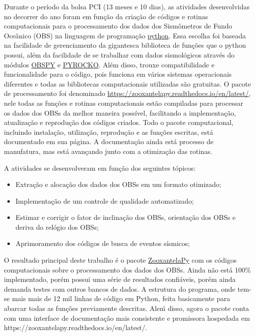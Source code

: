 \documentclass[10pt,a4paper,oneside]{book}
\begin{document}
Durante o período da bolsa PCI (13 meses e 10 dias), as atividades desenvolvidas no decorrer do ano foram em função da criação de códigos e rotinas computacionais para o processamento dos dados dos Sismômetros de Fundo Oceânico (OBS) na linguagem de programação \href{https://www.python.org/}{python}. Essa escolha foi baseada na facilidade de gerenciamento da gigantesca biblioteca de funções que o python possui, além da facilidade de se trabalhar com dados sismológicos através do módulos \href{https://docs.obspy.org/}{OBSPY} e \href{https://pyrocko.org/}{PYROCKO}. Além disso, trouxe compatibilidade e funcionalidade para o código, pois funciona em vários sistemas operacionais diferentes e todas as bibliotecas computacionais utilizadas são gratuitas. O pacote de processamento foi denominado \href{ZooxantelaPy - Ocean Bottom Seismometer Toolkit}{https://zooxantelapy.readthedocs.io/en/latest/}, nele todas as funções e rotinas computacionais estão compiladas para processar  os dados dos OBSs da melhor maneira possível, facilitando a implementação, atualização e reprodução dos códigos criados. Todo o pacote computacional, incluindo instalação, utilização, reprodução e as funções escritas, está documentado em sua página. A documentação ainda está processo de manufatura, mas está avançando junto com a otimização das rotinas.

A atividades se desenvolveram em função dos seguintes tópicos:
\begin{itemize}
	\item Extração e alocação dos dados dos OBSs em um formato otimizado;
	\item Implementação de um controle de qualidade automatizado;
	\item Estimar e corrigir o fator de inclinação dos OBSs, orientação dos OBSs e deriva do relógio dos OBSs;
	\item Aprimoramento dos códigos de busca de eventos sísmicos;
\end{itemize}

O resultado principal deste trabalho é o pacote \href{https://github.com/dIOGOLOC/ZooxantelaPy}{ZooxantelaPy} com os códigos computacionais sobre o processamento dos dados dos OBSs. Ainda não está 100\% implementado, porém possui uma série de resultados confiáveis, porém ainda demanda testes com outros bancos de dados. A estrutura do programa, onde tem-se mais mais de 12 mil linhas de código em Python, feita basicamente para abarcar todas as funções previamente descritas. Aleḿ disso, agora o pacote conta com uma interface de documentação mais consistente e promissora hospedada em https://zooxantelapy.readthedocs.io/en/latest/.
\end{document}

